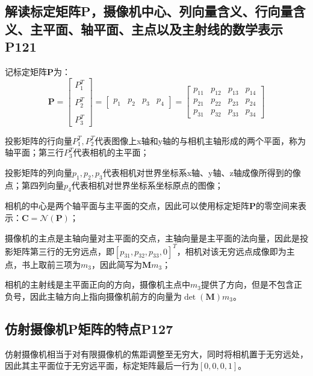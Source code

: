 \documentclass[11pt]{article}
\begin{document}
\subsection{解读标定矩阵P，摄像机中心、列向量含义、行向量含义、主平面、轴平面、主点以及主射线的数学表示P121}
记标定矩阵$\mathbf{P}$为：
\begin{equation*}
  \mathbf{P}=\begin{bmatrix}
    P_1^T\\\\
    P_2^T\\\\
    P_3^T
  \end{bmatrix}
  =\begin{bmatrix}
    p_1&p_2&p_3&p_4
  \end{bmatrix}=\begin{bmatrix}
    p_{11}&p_{12}&p_{13}&p_{14}\\
    p_{21}&p_{22}&p_{23}&p_{24}\\
    p_{31}&p_{32}&p_{33}&p_{34}
  \end{bmatrix}
\end{equation*}\par
投影矩阵的行向量$P_1^T,P_2^T$代表图像上x轴和y轴的与相机主轴形成的两个平面，称为轴平面；第三行$P_3^T$代表相机的主平面；\par
投影矩阵的列向量$p_1,p_2,p_3$代表相机对世界坐标系x轴、y轴、z轴成像所得到的像点；第四列向量$p_4$代表相机对世界坐标系坐标原点的图像；\par
相机的中心是两个轴平面与主平面的交点，因此可以使用标定矩阵$\mathbf{P}$的零空间来表示：$\mathbf{C}=\mathcal{N}(\mathbf{P})$；\par
摄像机的主点是主轴向量对主平面的交点，主轴向量是主平面的法向量，因此是投影矩阵第三行的无穷远点，即$[p_{31},p_{32},p_{33},0]^T$，相机对该无穷远点成像即为主点，书上取前三项为$m_3$，因此简写为$\mathbf{M}m_3$；\par
相机的主射线是主平面正向的方向，摄像机主点中$m_3$提供了方向，但是不包含正负号，因此主轴方向上指向摄像机前方的向量为$\det(\mathbf{M})m_3$。
\subsection{	仿射摄像机P矩阵的特点P127}
仿射摄像机相当于对有限摄像机的焦距调整至无穷大，同时将相机置于无穷远处，因此其主平面位于无穷远平面，标定矩阵最后一行为$[0,0,0,1]$。
\end{document}
